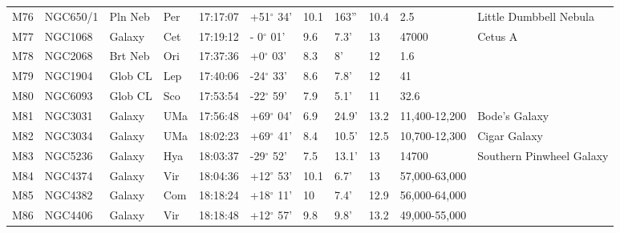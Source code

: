 \begin{longtable}{@{}lllllllllll@{}}
M76        & NGC650/1    & Pln Neb    & Per       & 17:17:07 & +51$^{\circ}$ 34'  & 10.1      & 163''                & 10.4     & 2.5                 & Little Dumbbell Nebula                    \\
M77        & NGC1068     & Galaxy     & Cet       & 17:19:12 & - 0$^{\circ}$ 01'  & 9.6       & 7.3'                 & 13       & 47000               & Cetus A                                   \\
M78        & NGC2068     & Brt Neb    & Ori       & 17:37:36 & +0$^{\circ}$ 03'   & 8.3       & 8'                   & 12       & 1.6                 &                                           \\
M79        & NGC1904     & Glob CL    & Lep       & 17:40:06 & -24$^{\circ}$ 33'  & 8.6       & 7.8'                 & 12       & 41                  &                                           \\
M80        & NGC6093     & Glob CL    & Sco       & 17:53:54 & -22$^{\circ}$ 59'  & 7.9       & 5.1'                 & 11       & 32.6                &                                           \\
M81        & NGC3031     & Galaxy     & UMa       & 17:56:48 & +69$^{\circ}$ 04'  & 6.9       & 24.9'                & 13.2     & 11,400-12,200       & Bode's Galaxy                             \\
M82        & NGC3034     & Galaxy     & UMa       & 18:02:23 & +69$^{\circ}$ 41'  & 8.4       & 10.5'                & 12.5     & 10,700-12,300       & Cigar Galaxy                              \\
M83        & NGC5236     & Galaxy     & Hya       & 18:03:37 & -29$^{\circ}$ 52'  & 7.5       & 13.1'                & 13       & 14700               & Southern Pinwheel Galaxy                  \\
M84        & NGC4374     & Galaxy     & Vir       & 18:04:36 & +12$^{\circ}$ 53'  & 10.1      & 6.7'                 & 13       & 57,000-63,000       &                                           \\
M85        & NGC4382     & Galaxy     & Com       & 18:18:24 & +18$^{\circ}$ 11'  & 10        & 7.4'                 & 12.9     & 56,000-64,000       &                                           \\
M86        & NGC4406     & Galaxy     & Vir       & 18:18:48 & +12$^{\circ}$ 57'  & 9.8       & 9.8'                 & 13.2     & 49,000-55,000       &                                           \\

\end{longtable}
